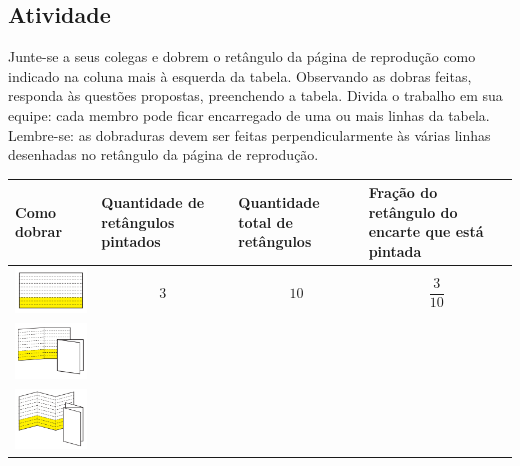 \subsection{Atividade}

Junte-se a seus colegas e dobrem o retângulo da página de reprodução como indicado na coluna mais à esquerda da tabela. Observando as dobras feitas, responda às questões propostas, preenchendo a tabela. Divida o trabalho em sua equipe: cada membro pode ficar encarregado de uma ou mais linhas da tabela. Lembre-se: as dobraduras devem ser feitas perpendicularmente às várias linhas desenhadas no retângulo da página de reprodução.


  \begin{longtable}{|m{}|m{}|m{}|m{}|}
    \hline
      Como dobrar  &  Quantidade de retângulos pintados  & Quantidade total de retângulos  &  Fração do retângulo do encarte que está pintada  \\
    \hline \hline
    \endhead
    \includegraphics[width=110pt, keepaspectratio]{../media/cap4/secoes/pngs/ativ2_fig01.png}      & $$3$$& $$10$$ & $$\dfrac{3}{10}$$   \\
    \hline
     \includegraphics[width=110pt, keepaspectratio]{../media/cap4/secoes/pngs/ativ2_fig02.png}                                                                              & &  &  \\
    \hline
     \includegraphics[width=110pt, keepaspectratio]{../media/cap4/secoes/pngs/ativ2_fig03.png}     &  &   &  \\

\end{longtable}
